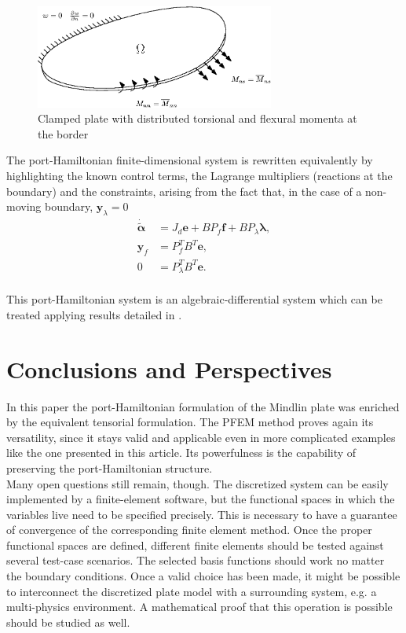 \documentclass[preprint,12pt]{elsarticle}
\begin{document}
\begin{figure}[t]
	\centering
	\includegraphics[width=0.7\textwidth]{Plate_Bcs.eps}
	\caption{Clamped plate with distributed torsional and flexural momenta at the border}
	\label{fig:mix_bcs}
\end{figure}

The port-Hamiltonian finite-dimensional system is rewritten equivalently by highlighting the known control terms, the Lagrange multipliers (reactions at the boundary) and the constraints, arising from the fact that, in the case of a non-moving boundary, $\bm{y}_{\lambda} = 0$
\begin{equation}
\begin{aligned}
\label{eq:PHdiscr_mixed}
\dot{\bm{\tilde{\alpha}}} &= J_d \bm{e}+ B P_{f} \bm{f}  + B P_{\lambda} \bm{\lambda}, \\
\bm{y}_{f} &= P_{f}^T B^T \bm{e}, \\
0 &= P_{\lambda}^T B^T \bm{e}. \\
\end{aligned}
\end{equation}

This port-Hamiltonian system is an algebraic-differential system which can be treated applying results detailed in \cite{vanderSchaft2013,beattie2017port}.



\section*{Conclusions and Perspectives}

In this paper the port-Hamiltonian formulation of the Mindlin plate was enriched by the equivalent tensorial formulation. The PFEM method proves again its versatility, since it stays valid and applicable even in more complicated examples like the one presented in this article. Its powerfulness is the capability of preserving the port-Hamiltonian structure. \\

Many open questions still remain, though. The discretized system can be easily implemented by a finite-element software, but the functional spaces in which the variables live need to be specified precisely. This is necessary to have a guarantee of convergence of the corresponding finite element method. 
Once the proper functional spaces are defined, different finite elements should be tested against several test-case scenarios. The selected basis functions should work no matter the boundary conditions. Once a valid choice has been made, it might be possible to interconnect the discretized plate model with a surrounding system, e.g. a multi-physics environment. A mathematical proof that this operation is possible should be studied as well. \\
\end{document}
